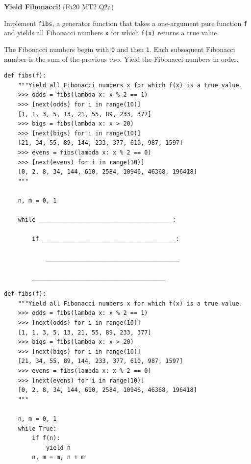 \documentclass{exam}
\newlength{\currentparskip}
\newenvironment{blocksection}
{
    \setlength{\currentparskip}{\parskip}%
    \begin{minipage}{\linewidth}
    \setlength{\parskip}{\currentparskip}%
}
{
    \end{minipage}
}
\begin{document}
\begin{questions}
    
\begin{blocksection}
\question \textbf{Yield Fibonacci!} (Fa20 MT2 Q2a)

    Implement \lstinline{fibs}, a generator function that takes a one-argument pure function \lstinline{f} and yields all Fibonacci numbers \lstinline{x} for which \lstinline{f(x)} returns a true value.
    
    The Fibonacci numbers begin with \lstinline{0} and then \lstinline{1}. Each subsequent Fibonacci number is the sum of the previous two. Yield the Fibonacci numbers in order.
\begin{lstlisting}
def fibs(f):
    """Yield all Fibonacci numbers x for which f(x) is a true value.
    >>> odds = fibs(lambda x: x % 2 == 1)
    >>> [next(odds) for i in range(10)]
    [1, 1, 3, 5, 13, 21, 55, 89, 233, 377]
    >>> bigs = fibs(lambda x: x > 20)
    >>> [next(bigs) for i in range(10)]
    [21, 34, 55, 89, 144, 233, 377, 610, 987, 1597]
    >>> evens = fibs(lambda x: x % 2 == 0)
    >>> [next(evens) for i in range(10)]
    [0, 2, 8, 34, 144, 610, 2584, 10946, 46368, 196418]
    """
    
    n, m = 0, 1

    while ______________________________________:

        if ______________________________________:

            ______________________________________

        ______________________________________
\end{lstlisting}
\end{blocksection}
\begin{solution}
\begin{lstlisting}
def fibs(f):
    """Yield all Fibonacci numbers x for which f(x) is a true value.
    >>> odds = fibs(lambda x: x % 2 == 1)
    >>> [next(odds) for i in range(10)]
    [1, 1, 3, 5, 13, 21, 55, 89, 233, 377]
    >>> bigs = fibs(lambda x: x > 20)
    >>> [next(bigs) for i in range(10)]
    [21, 34, 55, 89, 144, 233, 377, 610, 987, 1597]
    >>> evens = fibs(lambda x: x % 2 == 0)
    >>> [next(evens) for i in range(10)]
    [0, 2, 8, 34, 144, 610, 2584, 10946, 46368, 196418]
    """
    
    n, m = 0, 1
    while True:
        if f(n):
            yield n
        n, m = m, n + m
\end{lstlisting}
\end{solution}



\end{questions}
\end{document}
